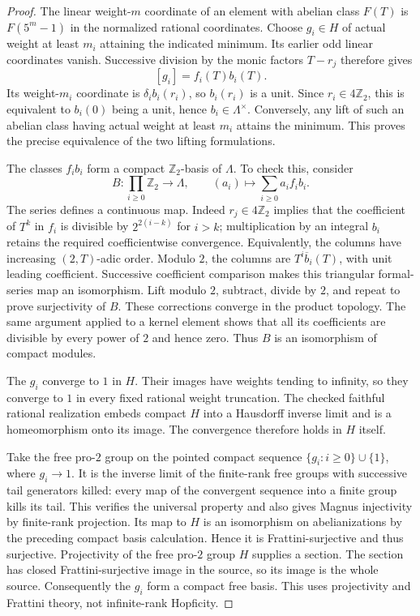 \begin{proof}
The linear weight-$m$ coordinate of an element with abelian
class $F(T)$ is $F(5^m-1)$ in the normalized rational
coordinates. Choose $g_i\in H$ of actual weight at least
$m_i$ attaining the indicated minimum. Its earlier odd linear
coordinates vanish. Successive division by the monic factors
$T-r_j$ therefore gives
\[
 [g_i]=f_i(T)b_i(T).
\]
Its weight-$m_i$ coordinate is $\delta_i b_i(r_i)$, so
$b_i(r_i)$ is a unit. Since $r_i\in4\mathbb Z_2$, this is
equivalent to $b_i(0)$ being a unit, hence
$b_i\in\Lambda^\times$. Conversely, any lift of such an
abelian class having actual weight at least $m_i$ attains the
minimum. This proves the precise equivalence of the two
lifting formulations.

The classes $f_i b_i$ form a compact $\mathbb Z_2$-basis of
$\Lambda$. To check this, consider
\[
 B:\prod_{i\geq0}\mathbb Z_2\longrightarrow\Lambda,
       \qquad (a_i)\longmapsto\sum_{i\geq0}a_i f_i b_i.
\]
The series defines a continuous map. Indeed $r_j\in4\mathbb Z_2$
implies that the coefficient of $T^k$ in $f_i$ is divisible by
$2^{2(i-k)}$ for $i>k$; multiplication by an integral $b_i$
retains the required coefficientwise convergence. Equivalently,
the columns have increasing $(2,T)$-adic order. Modulo $2$,
the columns are $T^i\overline b_i(T)$, with unit leading
coefficient. Successive coefficient comparison makes this
triangular formal-series map an isomorphism. Lift modulo $2$,
subtract, divide by $2$, and repeat to prove surjectivity of
$B$. These corrections converge in the product topology.
The same argument applied to a kernel element shows that all
its coefficients are divisible by every power of $2$ and hence
zero. Thus $B$ is an isomorphism of compact modules.

The $g_i$ converge to $1$ in $H$. Their images have weights
tending to infinity, so they converge to $1$ in every fixed
rational weight truncation. The checked faithful rational
realization embeds compact $H$ into a Hausdorff inverse limit
and is a homeomorphism onto its image. The convergence therefore
holds in $H$ itself.

Take the free pro-$2$ group on the pointed compact sequence
$\{g_i:i\geq0\}\cup\{1\}$, where $g_i\to1$. It is the inverse
limit of the finite-rank free groups with successive tail
generators killed: every map of the convergent sequence into a
finite group kills its tail. This verifies the universal
property and also gives Magnus injectivity by finite-rank
projection. Its map to $H$
is an isomorphism on abelianizations by the preceding compact
basis calculation. Hence it is Frattini-surjective and thus
surjective. Projectivity of the free pro-$2$ group $H$ supplies
a section. The section has closed Frattini-surjective image in
the source, so its image is the whole source. Consequently the
$g_i$ form a compact free basis. This uses projectivity and
Frattini theory, not infinite-rank Hopficity.


\end{proof}
